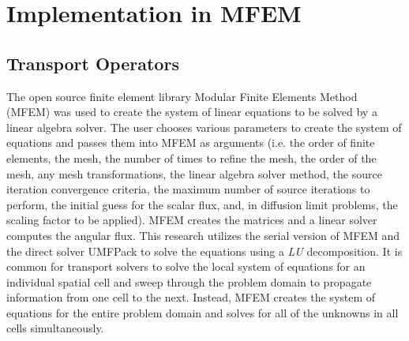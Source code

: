 \documentclass{article}
\begin{document}
\section{Implementation in MFEM}

\subsection{Transport Operators}
\label{subsub:TransportOperators}
The open source finite element library Modular Finite Elements Method (MFEM) \cite{MFEM_Web} was used to create the system of linear equations to be solved by a linear algebra solver. The user chooses various parameters to create the system of equations and passes them into MFEM as arguments (i.e. the order of finite elements, the mesh, the number of times to refine the mesh, the order of the mesh, any mesh transformations, the linear algebra solver method, the source iteration convergence criteria, the maximum number of source iterations to perform, the initial guess for the scalar flux, and, in diffusion limit problems, the scaling factor to be applied). MFEM creates the matrices and a linear solver computes the angular flux. This research utilizes the serial version of MFEM and the direct solver UMFPack \cite{SuiteSparse,DavisUMFPack} to solve the equations using a \emph{LU} decomposition. It is common for transport solvers to solve the local system of equations for an individual spatial cell and sweep through the problem domain to propagate information from one cell to the next. Instead, MFEM creates the system of equations for the entire problem domain and solves for all of the unknowns in all cells simultaneously.

\end{document}
